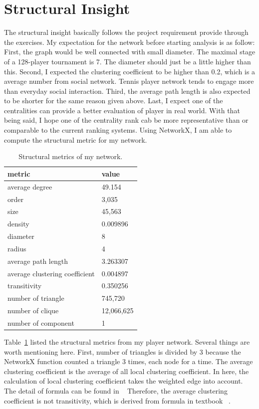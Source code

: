 \documentclass[runningheads]{llncs}
\begin{document}

\section{Structural Insight}

The structural insight basically follows the project requirement provide through the exercises.  My expectation for the network before starting analysis is as follow: 
First, the graph would be well connected with small diameter. The maximal stage of a 128-player tournament is 7. The diameter should just be a little higher than this. Second, I expected the clustering coefficient to be higher than 0.2, which is a average number from social network. Tennis player network tends to engage more than everyday social interaction. Third, the average path length is also expected to be shorter for the same reason given above. Last, I expect one of the centralities can provide a better evaluation of player in real world. With that being said, I hope one of the centrality rank cab be more representative than or comparable to the current ranking systems.
Using NetworkX, I am able to compute the structural metric for my network.
\begin{table}[H]
\centering
\caption{Structural metrics of my network.}\label{tab_my}
\begin{tabular}{|l|l|}
\hline
metric & value \\
\hline
average degree & 49.154 \\
order & 3,035 \\
size & 45,563 \\
density & 0.009896 \\
diameter & 8 \\
radius & 4 \\
average path length & 3.263307 \\
average clustering coefficient & 0.004897 \\
transitivity & 0.350256 \\
number of triangle & 745,720 \\ 
number of clique & 12,066,625 \\
number of component & 1\\
\hline
\end{tabular}
\end{table}


Table~\ref{tab_my} listed the structural metrics from my player network.
 Several things are worth mentioning here. First, number of  triangles is divided by 3 because the NetworkX function counted a triangle 3 times, each node for a time. The average clustering coefficient is the average of all local clustering coefficient. In here, the calculation of local clustering coefficient takes the weighted edge into account. The detail of formula can be found in ~\cite{ref_url_cluster_coeff} Therefore, the average clustering coefficient is not transitivity, which is derived from formula in textbook ~\cite{ref_book1}.
\end{document}
